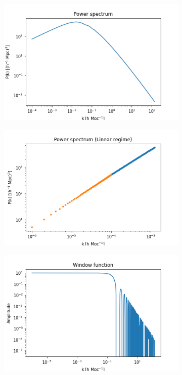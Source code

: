 \documentclass[12pt]{article}
\begin{document}
\begin{figure}[ht]
	\centering
	\begin{subfigure}[b]{0.49\textwidth}
		\centering
		\includegraphics[width=\textwidth]{powerSpectrum.png}
	\end{subfigure}
	\hfill
	\begin{subfigure}[b]{0.49\textwidth}
		\centering
		\includegraphics[width=\textwidth]{powerLinear.png}
	\end{subfigure}
	\begin{subfigure}[b]{0.49\textwidth}
		\centering
		\includegraphics[width=\textwidth]{windowFunction.png}

\end{subfigure}
\end{figure}
\end{document}
